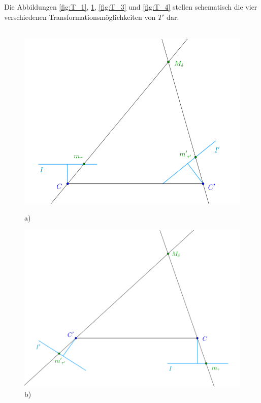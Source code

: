 Die Abbildungen \ref{fig:T_1}, \ref{fig:T_2}, \ref{fig:T_3} und \ref{fig:T_4} stellen schematisch die vier verschiedenen Transformationsmöglichkeiten von $T'$ dar. \\\\


\begin{figure}[!htb]
	\includegraphics[width=\linewidth]{images/P_Solution_one.png}
	\caption{a)}
	\label{fig:T_1}
	\endminipage\hfill
	\includegraphics[width=\linewidth]{images/P_Solution_two.png}
	\caption{b)}
	\label{fig:T_2}
	\endminipage\hfill
\end{figure}
